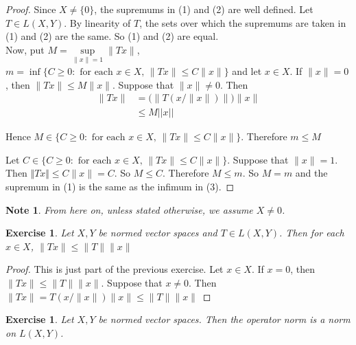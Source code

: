 \documentclass[12pt]{amsart}
\newtheorem{note}[thm]{Note}
\newtheorem{ex}[thm]{Exercise}
\begin{document}
	\begin{proof} Since $X \neq \{0\}$, the supremums in (1) and (2) are well defined. Let $T \in L(X,Y)$. By linearity of $T$, the sets over which the supremums are taken in (1) and (2) are the same. So (1) and (2) are equal.\vspace{1cm}\\
		
		Now, put $M = \sup\limits_{\|x \|=1} \|Tx \|$, $m = \inf \{C \geq 0: \text{ for each }x \in X\text{, } \|Tx \|\leq C \|x \|\}$ and let $x \in X$. If $\|x \|=0$, then $\|Tx \|\leq M \|x \|$. Suppose that $\|x \|\neq 0$. Then 
		\begin{align*}
			\|Tx \|
			&= \bigg(\big\|T(x/\|x\|)\big\|\bigg)\|x \|\\
			& \leq M ||x||
		\end{align*}
		
		Hence $M \in \{C \geq 0: \text{ for each }x \in X\text{, } \|Tx \|\leq C \|x \|\}$. Therefore $m \leq M$
		
		Let $C \in \{C \geq 0: \text{ for each }x \in X\text{, } \|Tx \|\leq C \|x\|\}$. Suppose that $\|x \|=1$. Then $\Vert Tx\Vert \leq C \|x \|= C$. So $M \leq C$. Therefore $M \leq m$. So $M=m$ and the supremum in (1) is the same as the infimum in (3). 
	\end{proof}
	
	\begin{note}
		From here on, unless stated otherwise, we assume $X \neq 0$.
	\end{note}
	
	\begin{ex}
		Let $X,Y$ be normed vector spaces and $T \in L(X,Y)$. Then for each $x \in X$, $\|Tx \| \leq \|T\|\|x \|$
	\end{ex}
	
	\begin{proof}
		This is just part of the previous exercise. Let $x \in X$. If $x = 0$, then $\|Tx \|\leq \|T \|\|x \|$. Suppose that $x \neq 0$. Then $\|Tx \|= T(x/\|x\|)\|x\|\leq \|T \|\|x \|$
	\end{proof}
	
	\begin{ex}
		Let $X, Y$ be normed vector spaces. Then the operator norm is a norm on $L(X,Y)$.
	\end{ex}
	
\end{document}

